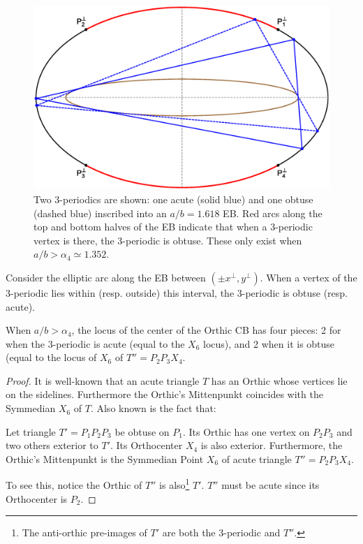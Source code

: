 \begin{figure}
    \centering
    \includegraphics[width=.66\textwidth]{pics_eps_new/0080_rect_zones.eps}
    \caption{Two 3-periodics are shown: one acute (solid blue) and one obtuse (dashed blue) inscribed into an $a/b=1.618$ EB. Red arcs along the top and bottom halves of the EB indicate that when a 3-periodic vertex is there, the 3-periodic is obtuse. These only exist when $a/b>\alpha_4{\simeq}1.352$.}
    \label{fig:rect_zones}
\end{figure}

Consider the elliptic arc along the EB between $({\pm}x^\perp,y^\perp)$. When a vertex of the 3-periodic lies within  (resp. outside) this interval, the 3-periodic is obtuse (resp. acute).

\begin{proposition}
When $a/b>\alpha_4$, the locus of the center of the Orthic CB has four pieces: 2 for when the 3-periodic is acute (equal to the $X_6$ locus), and 2 when it is obtuse (equal to the locus of $X_6$ of $T''=P_2P_3X_4$.
\end{proposition}

\begin{proof}
It is well-known that \cite{etc} an acute triangle $T$ has an Orthic whose vertices lie on the sidelines. Furthermore the Orthic's Mittenpunkt coincides with the Symmedian $X_6$ of $T$. Also known is the fact that:

\begin{remark}
Let triangle $T'=P_1P_2P_3$ be obtuse on $P_1$. Its Orthic has one vertex on $P_2P_3$ and  two others exterior to $T'$. Its Orthocenter $X_4$ is also exterior. Furthermore, the Orthic's Mittenpunkt is the Symmedian Point $X_6$ of acute triangle $T''=P_2P_3X_4$.
\end{remark}

To see this, notice the Orthic of $T''$ is also\footnote{The anti-orthic pre-images of $T'$ are both the 3-periodic and $T''$.} $T'$. $T''$ must be acute since its Orthocenter is $P_2$.
\end{proof}

